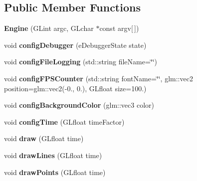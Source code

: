 \subsection*{Public Member Functions}
\begin{DoxyCompactItemize}
\item 
{\bfseries Engine} (G\+Lint argc, G\+Lchar $\ast$const argv\mbox{[}$\,$\mbox{]})\hypertarget{classflw_1_1Engine_a8efacbf047d08cc6e04cf81af63bcc4f}{}\label{classflw_1_1Engine_a8efacbf047d08cc6e04cf81af63bcc4f}

\item 
void {\bfseries config\+Debugger} (e\+Debugger\+State state)\hypertarget{classflw_1_1Engine_a0e9fd50ccc0377a675a33b423844ba84}{}\label{classflw_1_1Engine_a0e9fd50ccc0377a675a33b423844ba84}

\item 
void {\bfseries config\+File\+Logging} (std\+::string file\+Name=\char`\"{}\char`\"{})\hypertarget{classflw_1_1Engine_ab7c9423b53e553e0cf8932c7a8e6a3c1}{}\label{classflw_1_1Engine_ab7c9423b53e553e0cf8932c7a8e6a3c1}

\item 
void {\bfseries config\+F\+P\+S\+Counter} (std\+::string font\+Name=\char`\"{}\char`\"{}, glm\+::vec2 position=glm\+::vec2(-\/0., 0.), G\+Lfloat size=100.)\hypertarget{classflw_1_1Engine_ac155824c8e1f16457f8788836eb9d0d3}{}\label{classflw_1_1Engine_ac155824c8e1f16457f8788836eb9d0d3}

\item 
void {\bfseries config\+Background\+Color} (glm\+::vec3 color)\hypertarget{classflw_1_1Engine_a095771e29420c83636acb355701e0751}{}\label{classflw_1_1Engine_a095771e29420c83636acb355701e0751}

\item 
void {\bfseries config\+Time} (G\+Lfloat time\+Factor)\hypertarget{classflw_1_1Engine_ac35ea4a508bc9bda596b84d9dc6a0ca3}{}\label{classflw_1_1Engine_ac35ea4a508bc9bda596b84d9dc6a0ca3}

\item 
void {\bfseries draw} (G\+Lfloat time)\hypertarget{classflw_1_1Engine_a65d5d45571a4a9831da5954b2848e7eb}{}\label{classflw_1_1Engine_a65d5d45571a4a9831da5954b2848e7eb}

\item 
void {\bfseries draw\+Lines} (G\+Lfloat time)\hypertarget{classflw_1_1Engine_ad9bbbabe65c1c59a3b9ace8900ade8f3}{}\label{classflw_1_1Engine_ad9bbbabe65c1c59a3b9ace8900ade8f3}

\item 
void {\bfseries draw\+Points} (G\+Lfloat time)\hypertarget{classflw_1_1Engine_af5d70bafff4bb7a38a59805f6e1f3c18}{}\label{classflw_1_1Engine_af5d70bafff4bb7a38a59805f6e1f3c18}


\end{DoxyCompactItemize}
